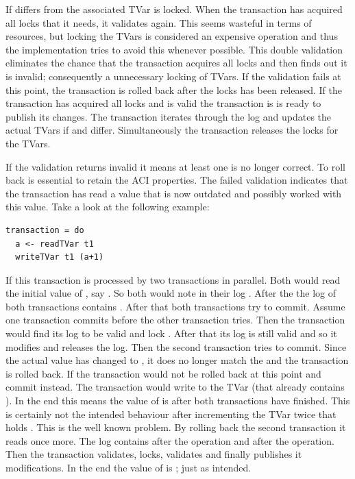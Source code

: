 If  differs from  the associated TVar is locked. When the transaction has acquired all 
locks that it needs, it validates again. This seems wasteful in terms of resources, but locking the TVars is considered
an expensive operation and thus the implementation tries to avoid this whenever possible. This double validation eliminates the chance
that the transaction acquires all locks and then finds out it is invalid; consequently a unnecessary locking of TVars.
If the validation fails at this point, the transaction is rolled back after the locks has been released.
If the transaction has acquired all locks and is valid the transaction is is ready to publish its changes.
The transaction iterates through the log and updates the actual TVars if  and  differ. 
Simultaneously the transaction releases the locks for the TVars. 

If the validation returns invalid it means at least one  is no longer correct. To roll back is essential 
to retain the ACI properties. The failed validation indicates that the transaction has read a value that is now outdated and possibly worked 
with this value. Take a look at the following example:
\begin{lstlisting}
transaction = do 
  a <- readTVar t1
  writeTVar t1 (a+1)
\end{lstlisting}
If this transaction is processed by two transactions in parallel. Both would read the initial value of , say .
So both would note in their log . After the  the log of both transactions contains 
. After that both transactions try to commit. Assume one transaction commits before the other transaction tries.
Then the transaction would find its log to be valid and lock . After that its log is still valid and so it modifies 
 and releases the log. 
Then the second transaction tries to commit. Since the actual value has changed to , it does no longer match 
the  and the transaction is rolled back. If the transaction would not be rolled back at this point
and commit instead. The transaction would write  to the TVar (that already contains ). In the end 
this means the value of  is  after both transactions have finished. This is certainly not the 
intended behaviour after incrementing the TVar twice that holds . This is the well known 
problem. 
By rolling back the second transaction it reads  once more. The log contains  after the 
operation and  after the  operation. Then the transaction validates, locks, validates and 
finally publishes it modifications. In the end the value of  is ; just as intended.

